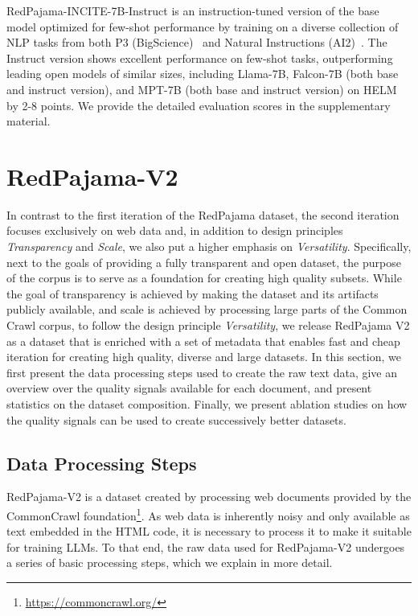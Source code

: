 \documentclass{article}
\begin{document}
RedPajama-INCITE-7B-Instruct is an instruction-tuned version of the base model optimized for few-shot performance by training on a diverse collection of NLP tasks from both P3 (BigScience)~\cite{sanh2021multitask} and Natural Instructions (AI2)~\cite{naturalinstructions}. The Instruct version shows excellent performance on few-shot tasks, outperforming leading open models of similar sizes, including Llama-7B, Falcon-7B (both base and instruct version), and MPT-7B (both base and instruct version) on HELM by 2-8 points. We provide the detailed evaluation scores in the supplementary material.

\section{RedPajama-V2}
\label{sec:rpv2}
In contrast to the first iteration of the RedPajama dataset, the second iteration focuses exclusively on web data and, in addition to design principles {\it Transparency} and {\it Scale}, we also put a higher emphasis on {\it Versatility}. Specifically, next to the goals of providing a fully transparent and open dataset, the purpose of the corpus is to serve as a foundation for creating high quality subsets. While the goal of transparency is achieved by making the dataset and its artifacts publicly available, and scale is achieved by processing large parts of the Common Crawl corpus, to follow the design principle {\it Versatility}, we release RedPajama V2 as a dataset that is enriched with a set of metadata that enables fast and cheap iteration for creating high quality, diverse and large datasets. 
In this section, we first present the data processing steps used to create the raw text data, give an overview over the quality signals available for each document, and present statistics on the dataset composition. Finally, we present ablation studies on how the quality signals can be used to create successively better datasets.

\subsection{Data Processing Steps}
RedPajama-V2 is a dataset created by processing web documents provided by the CommonCrawl foundation\footnote{\url{https://commoncrawl.org/}}. As web data is inherently noisy and only available as text embedded in the HTML code, it is necessary to process it to make it suitable for training LLMs. To that end, the raw data used for RedPajama-V2 undergoes a series of basic processing steps, which we explain in more detail.
\end{document}
